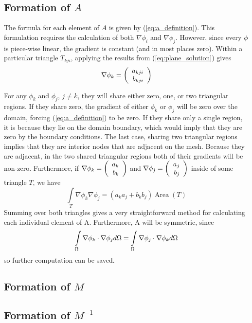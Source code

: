 \documentclass[a4paper,12pt]{article}
\begin{document}
\subsection{Formation of $A$}
The formula for each element of $A$ is given by (\ref{eq:a_definition}). This formulation requires the calculation
of both $\nabla \phi_i$ and $\nabla \phi_j$. However, since every $\phi$ is piece-wise linear, the gradient
is constant (and in most places zero). Within a particular triangle $T_{kji}$, applying the results from
(\ref{eq:plane_solution}) gives
\begin{equation} \label{eq:grad_phi_definition}
\nabla \phi_k = \left(\begin{array}{rrrr} a_{kji} \\ b_{kji} \\ \end{array} \right)
\end{equation}

For any $\phi_k$ and $\phi_j$, $j \ne k$, they will share either zero, one, or two triangular regions. If they share
zero, the gradient of either $\phi_k$ or $\phi_j$ will be zero over the domain, forcing (\ref{eq:a_definition}) to
be zero. If they share only a single region, it is because they lie on the domain boundary, which would imply that
they are zero by the boundary conditions. The last case, sharing two triangular regions implies that they are interior
nodes that are adjacent on the mesh. Because they are adjacent, in the two shared triangular regions both of their
gradients will be non-zero. Furthermore, if $\nabla \phi_k = \left(\begin{array}{rrrr} a_k \\ b_k \\ \end{array} \right)$ and $\nabla \phi_j = \left(\begin{array}{rrrr} a_j \\ b_j \\ \end{array} \right)$
inside of some triangle $T$, we have
\begin{equation}
\int\limits_T \nabla \phi_k \nabla \phi_j
=
\left( a_k a_j + b_k b_j \right) \mathop{Area}(T)
\end{equation}
Summing over both triangles gives a very straightforward method for calculating each individual element of A. Furthermore,
A will be symmetric, since
\begin{equation}
\int\limits_{\Omega} \nabla \phi_k \cdot \nabla \phi_j d\Omega = \int\limits_{\Omega} \nabla \phi_j \cdot \nabla \phi_k d\Omega
\end{equation}
so further computation can be saved.

\subsection{Formation of $M$}
\subsection{Formation of $M^{-1}$}



\end{document}
